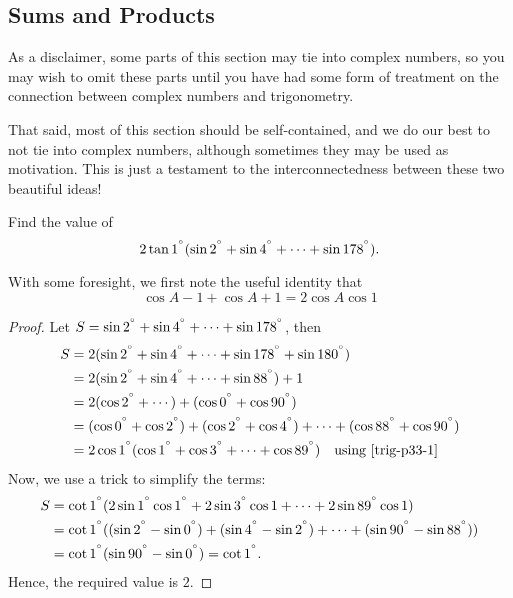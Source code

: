 \documentclass[../main.tex]{subfiles}
\begin{document}
\subsection{Sums and Products \med}
As a disclaimer, some parts of this section may tie into complex numbers, so you may wish to omit these parts until you have had some form of treatment on the connection between complex numbers and trigonometry.

That said, most of this section should be self-contained, and we do our best to not tie into complex numbers, although sometimes they may be used as motivation. This is just a testament to the interconnectedness between these two beautiful ideas!

\begin{example}[2014 SMO(S) P33]
    Find the value of $$2\tan{1^{^\circ}}(\sin{2^{^\circ}}+\sin{4^{^\circ}}+\cdots+\sin{178^{^\circ}}).$$    
\end{example}
With some foresight, we first note the useful identity that \begin{equation}\label{trig-p33-1}
    \cos{A-1}+\cos{A+1}=2\cos{A}\cos{1}
\end{equation}
\begin{proof}
    Let $S=\sin{2^{^\circ}}+\sin{4^{^\circ}}+\cdots+\sin{178^{^\circ}}$,
    then 
    \begin{align*}
        S&=2(\sin{2^{^\circ}}+\sin{4^{^\circ}}+\cdots+\sin{178^{^\circ}}+\sin{180^{^\circ}}) \\
        &=2(\sin{2^{^\circ}}+\sin{4^{^\circ}}+\cdots+\sin{88^{^\circ}})+1\\
        &=2(\cos{2^{^\circ}}+\cdots)+(\cos{0^{^\circ}}+\cos{90^{^\circ}})\\
        &=(\cos{0^{^\circ}}+\cos{2^{^\circ}})+(\cos{2^{^\circ}}+\cos{4^{^\circ}})+\cdots+(\cos{88^{^\circ}}+\cos{90^{^\circ}})\\
        &=2\cos{1^{^\circ}}(\cos{1^{^\circ}}+\cos{3^{^\circ}}+\cdots+\cos{89^{^\circ}}) \quad\text{using \eqref{trig-p33-1}}\\
    \end{align*}
    Now, we use a trick to simplify the terms:
    \begin{align*}
        S&=\cot{1^{^\circ}}(2\sin{1^{^\circ}}\cos{1^{^\circ}}+2\sin{3^{^\circ}\cos{1}+\cdots+2\sin{89^{^\circ}}}\cos{1}) \\
        &=\cot{1^{^\circ}}((\sin{2^{^\circ}}-\sin{0^{^\circ}})+(\sin{4^{^\circ}-\sin{2^{^\circ}}})+\cdots+(\sin{90^{^\circ}}-\sin{88^{^\circ}}))\\
        &=\cot{1^{^\circ}}(\sin{90^{^\circ}}-\sin{0^{^\circ}})=\cot{1^{^\circ}}.
    \end{align*}
    Hence, the required value is $\boxed{2}$.
\end{proof}
\end{document}
